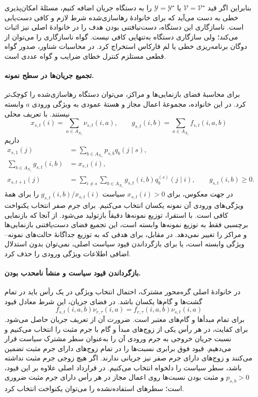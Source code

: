 بنابراین اگر قید $\mathcal V=\mathcal V^\star$ یا $\mathscr Y=\mathscr Y^\star$ را به دستگاه جریان اضافه کنیم، مسئلهٔ امکان‌پذیری خطی به دست می‌آید که برای خانوادهٔ رهاسازی‌شده شرط لازم و کافی دست‌یابی است. ناسازگاری این دستگاه، دست‌نیافتنی بودن هدف را در خانوادهٔ اصلی نیز اثبات می‌کند؛ ولی سازگاری دستگاه به‌تنهایی کافی نیست. گواه ناسازگاری را می‌توان از دوگان برنامه‌ریزی خطی یا لم فارکاس استخراج کرد. در محاسبات شناور، صدور گواه قطعی مستلزم کنترل خطای ضرایب و گواه عددی است.

\paragraph{تجمیع جریان‌ها در سطح نمونه.}
برای محاسبهٔ فضای بازنمایی‌ها و مراکز، می‌توان دستگاه رهاسازی‌شده را کوچک‌تر کرد. در این خانواده، مجموعهٔ اعمال مجاز و هستهٔ عمودی به ویژگی ورودی $a$ وابسته نیستند. با تعریف محلی
\[
x_{s,t}(i)=\sum_{a\in A_{X_i}}\nu_{s,t}(i,a),\qquad
g_{s,t}(i,b)=\sum_{a\in A_{X_i}}f_{s,t}(i,a,b)
\]
داریم
\begin{equation}\label{cmp:eq:ch3-geometry-aggregated-flow}
\begin{aligned}
x_{s,1}(j)&=\sum_{b\in A_{X_s}}p_{s,b}q_b(j\mid s),\\
\sum_{b\in A_{X_i}}g_{s,t}(i,b)&=x_{s,t}(i),\\
x_{s,t+1}(j)&=\sum_{i\ne s}\sum_{b\in A_{X_i}}g_{s,t}(i,b)q_b^{(s)}(j\mid i),\qquad g_{s,t}(i,b)\ge0.
\end{aligned}
\end{equation}
در جهت معکوس، برای $x_{s,t}(i)>0$ سیاست $g_{s,t}(i,b)/x_{s,t}(i)$ را برای همهٔ ویژگی‌های ورودی آن نمونه یکسان انتخاب می‌کنیم. برای جرم صفر انتخاب یکنواخت کافی است. با استقرا، توزیع نمونه‌ها دقیقاً بازتولید می‌شود. از آنجا که بازنمایی برچسبی فقط به توزیع نمونه‌ها وابسته است، این تجمیع فضای دست‌یافتنی بازنمایی‌ها و مراکز را تغییر نمی‌دهد. در مقابل، برای هدفی که به توزیع جداگانهٔ حالت‌های نمونه--ویژگی وابسته است، یا برای بازگرداندن قیود سیاست اصلی، نمی‌توان بدون استدلال اضافی اطلاعات ویژگی ورودی را حذف کرد.

\paragraph{بازگرداندن قیود سیاست و منشأ نامحدب بودن.}
در خانوادهٔ اصلی گره‌محور مشترک، احتمال انتخاب ویژگی در یک رأس باید در تمام گشت‌ها و گام‌ها یکسان باشد. در فضای جریان، این شرط معادل قیود
\begin{equation}\label{cmp:eq:ch3-geometry-flow-policy-sharing}
\boxed{f_{s,t}(i,a,b)\nu_{r,\tau}(i,a)=f_{r,\tau}(i,a,b)\nu_{s,t}(i,a)}
\end{equation}
برای تمام مبدأها و گام‌های معتبر است. ضرورت آن از تعریف جریان حاصل می‌شود. برای کفایت، در هر رأس یکی از زوج‌های مبدأ و گام با جرم مثبت را انتخاب می‌کنیم و نسبت جریان خروجی به جرم ورودی آن را به‌عنوان سطر مشترک سیاست قرار می‌دهیم. قیود فوق برابری نسبت‌ها را در تمام زوج‌های دارای جرم مثبت تضمین می‌کنند و زوج‌های دارای جرم صفر نیز جریانی ندارند. اگر هیچ زوجی جرم مثبت نداشته باشد، سطر سیاست را دلخواه انتخاب می‌کنیم. در قرارداد اصلی علاوه بر این قیود، $p_{s,b}>0$ و مثبت بودن نسبت‌ها روی اعمال مجاز در هر رأس دارای جرم مثبت ضروری است؛ سطرهای استفاده‌نشده را می‌توان یکنواخت انتخاب کرد.

